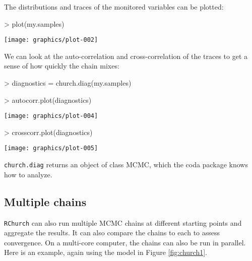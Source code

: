 \documentclass[12pt]{article}
\newcommand{\rchurch}{\texttt{RChurch}\xspace}
\begin{document}
The distributions and traces of the monitored variables can be plotted:
\begin{center}
\begin{Schunk}
\begin{Sinput}
> plot(my.samples)
\end{Sinput}
\end{Schunk}
\texttt{[image: graphics/plot-002]}
\end{center}

We can look at the auto-correlation and cross-correlation of the traces to get a sense of how quickly the chain mixes:
\begin{Schunk}
\begin{Sinput}
> diagnostics = church.diag(my.samples)
\end{Sinput}
\end{Schunk}

\begin{center}
\begin{Schunk}
\begin{Sinput}
> autocorr.plot(diagnostics)
\end{Sinput}
\end{Schunk}
\texttt{[image: graphics/plot-004]}

\begin{Schunk}
\begin{Sinput}
> crosscorr.plot(diagnostics)
\end{Sinput}
\end{Schunk}
\texttt{[image: graphics/plot-005]}
\end{center}

\verb|church.diag| returns an object of class MCMC, which the coda package knows how to analyze.

\subsection{Multiple chains}
\rchurch can also run multiple MCMC chains at different starting points and aggregate the results. It can also compare the chains to each to assess convergence. On a multi-core computer, the chains can also be run in parallel. Here is an example, again using the model in Figure \ref{fig:church1}.
\end{document}
